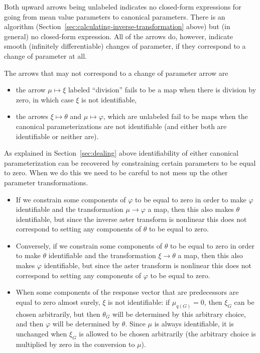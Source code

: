 Both upward arrows being unlabeled indicates no closed-form expressions
for going from mean value parameters to canonical parameters.
There is an algorithm (Section~\ref{sec:calculating-inverse-transformation}
above) but (in general) no closed-form expression.
All of the arrows do, however, indicate smooth (infinitely differentiable)
changes of parameter, if they correspond to a change of parameter at all.

The arrows that may not correspond to a change of parameter arrow are
\begin{itemize}
\item the arrow $\mu \mapsto \xi$ labeled ``division'' fails to be a map
    when there is division by zero, in which case $\xi$ is not identifiable,
\item the arrows $\xi \mapsto \theta$ and $\mu \mapsto \varphi$, which
    are unlabeled fail to be maps when the canonical parameterizations
    are not identifiable (and either both are identifiable or neither are).
\end{itemize}

As explained in Section~\ref{sec:dealing} above identifiability of either
canonical parameterization can be recovered by constraining certain parameters
to be equal to zero.  When we do this we need to be careful to not mess up
the other parameter transformations.
\begin{itemize}
\item If we constrain some components of $\varphi$ to be equal to zero in
    order to make $\varphi$ identifiable and the transformation
    $\mu \to \varphi$ a map, then this also makes $\theta$ identifiable,
    but since the inverse aster transform is nonlinear this does not
    correspond to setting any components of $\theta$ to be equal to zero.
\item Conversely, if we constrain some components of $\theta$ to be equal
    to zero in order to make $\theta$ identifiable and the transformation
    $\xi \to \theta$ a map, then this also makes $\varphi$ identifiable,
    but since the aster transform is nonlinear this does not
    correspond to setting any components of $\varphi$ to be equal to zero.
\item When some components of the response vector that are predecessors
    are equal to zero almost surely, $\xi$ is not identifiable:
    if $\mu_{q(G)} = 0$, then $\xi_G$ can be chosen arbitrarily,
    but then $\theta_G$ will be determined by this arbitrary choice,
    and then $\varphi$ will be determined by $\theta$.
    Since $\mu$ is always identifiable, it is unchanged when $\xi_G$
    is allowed to be chosen arbitrarily (the arbitrary choice is multiplied
    by zero in the conversion to $\mu$).
\end{itemize}

